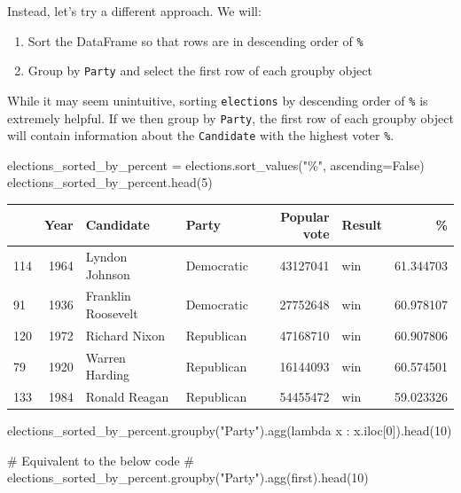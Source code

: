 \documentclass[
  letterpaper,
  DIV=11,
  numbers=noendperiod]{scrreprt}
\newenvironment{Shaded}{\begin{snugshade}}{\end{snugshade}}
\newcommand{\CommentTok}[1]{\textcolor[rgb]{0.37,0.37,0.37}{#1}}
\newcommand{\DecValTok}[1]{\textcolor[rgb]{0.68,0.00,0.00}{#1}}
\newcommand{\KeywordTok}[1]{\textcolor[rgb]{0.00,0.23,0.31}{#1}}
\newcommand{\NormalTok}[1]{\textcolor[rgb]{0.00,0.23,0.31}{#1}}
\newcommand{\OperatorTok}[1]{\textcolor[rgb]{0.37,0.37,0.37}{#1}}
\newcommand{\StringTok}[1]{\textcolor[rgb]{0.13,0.47,0.30}{#1}}
\newcommand{\VariableTok}[1]{\textcolor[rgb]{0.07,0.07,0.07}{#1}}
\providecommand{\tightlist}{%
  \setlength{\itemsep}{0pt}\setlength{\parskip}{0pt}}\usepackage{longtable,booktabs,array}
\begin{document}
Instead, let's try a different approach. We will:

\begin{enumerate}
\def\labelenumi{\arabic{enumi}.}
\tightlist
\item
  Sort the DataFrame so that rows are in descending order of \texttt{\%}
\item
  Group by \texttt{Party} and select the first row of each groupby
  object
\end{enumerate}

While it may seem unintuitive, sorting \texttt{elections} by descending
order of \texttt{\%} is extremely helpful. If we then group by
\texttt{Party}, the first row of each groupby object will contain
information about the \texttt{Candidate} with the highest voter
\texttt{\%}.

\begin{Shaded}
\begin{Highlighting}[]
\NormalTok{elections\_sorted\_by\_percent }\OperatorTok{=}\NormalTok{ elections.sort\_values(}\StringTok{"\%"}\NormalTok{, ascending}\OperatorTok{=}\VariableTok{False}\NormalTok{)}
\NormalTok{elections\_sorted\_by\_percent.head(}\DecValTok{5}\NormalTok{)}
\end{Highlighting}
\end{Shaded}

\begin{tabular}{lrllrlr}
\toprule
{} &  Year &           Candidate &       Party &  Popular vote & Result &          \% \\
\midrule
114 &  1964 &      Lyndon Johnson &  Democratic &      43127041 &    win &  61.344703 \\
91  &  1936 &  Franklin Roosevelt &  Democratic &      27752648 &    win &  60.978107 \\
120 &  1972 &       Richard Nixon &  Republican &      47168710 &    win &  60.907806 \\
79  &  1920 &      Warren Harding &  Republican &      16144093 &    win &  60.574501 \\
133 &  1984 &       Ronald Reagan &  Republican &      54455472 &    win &  59.023326 \\
\bottomrule
\end{tabular}

\begin{Shaded}
\begin{Highlighting}[]
\NormalTok{elections\_sorted\_by\_percent.groupby(}\StringTok{"Party"}\NormalTok{).agg(}\KeywordTok{lambda}\NormalTok{ x : x.iloc[}\DecValTok{0}\NormalTok{]).head(}\DecValTok{10}\NormalTok{)}

\CommentTok{\# Equivalent to the below code}
\CommentTok{\# elections\_sorted\_by\_percent.groupby("Party").agg(\textquotesingle{}first\textquotesingle{}).head(10)}
\end{Highlighting}
\end{Shaded}
\end{document}
